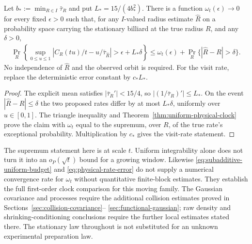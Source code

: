 \begin{corollary}
\label{cor:physical-rate-error}
Let $b_*:=\min_{R\in I}\bar\tau_R$ and put
$L_*=15/(4b_*^2)$. There is a function $\omega_t(\epsilon)\to0$
for every fixed $\epsilon>0$ such that, for any $I$-valued radius
estimate $\widehat R$ on a probability space carrying the stationary
billiard at the true radius $R$, and any $\delta>0$,
\begin{align}\label{eq:physical-rate-error}
 \Pr_R\left\{\sup_{0\le u\le1}
 \left|C_R(tu)/t-u/\bar\tau_{\widehat R}\right|
                       >\epsilon+L_*\delta\right\}
 \le\omega_t(\epsilon)+\Pr_R\{|\widehat R-R|>\delta\}.
\end{align}
No independence of $\widehat R$ and the observed orbit is required.
For the visit rate, replace the deterministic error constant by $c_*L_*$.
\end{corollary}
\begin{proof}
The explicit mean satisfies $|\bar\tau_R'|<15/4$, so
$|(1/\bar\tau_R)'|\le L_*$. On the event
$|\widehat R-R|\le\delta$ the two proposed rates differ by at
most $L_*\delta$, uniformly over $u\in[0,1]$. The triangle
inequality and Theorem~\ref{thm:uniform-physical-clock} prove the
claim with $\omega_t$ equal to the supremum, over $R$, of the true
rate's exceptional probability. Multiplication by $c_*$ gives the
visit-rate statement.
\end{proof}

The supremum statement here is at scale $t$. Uniform integrability
alone does not turn it into an $o_P(\sqrt t)$ bound for a growing
window. Likewise \eqref{eq:subadditive-uniform-budget} and
\eqref{eq:physical-rate-error} do not supply a numerical convergence
rate for $\omega_t$ without quantitative finite-block estimates.
They establish the full first-order clock comparison for this moving
family. The Gaussian covariance and processes require the additional
collision estimates proved in Sections~\ref{sec:collision-covariance}--
\ref{sec:functional-gaussian}; raw density and shrinking-conditioning
conclusions require the further local estimates stated there. The
stationary law throughout is not substituted for an unknown experimental
preparation law.
